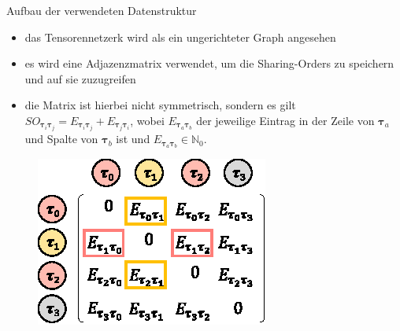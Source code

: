 \documentclass{beamer}
\begin{document}
			\begin{frame}{Aufbau der verwendeten Datenstruktur}
				\begin{itemize}
					\item das Tensorennetzerk wird als ein ungerichteter Graph angesehen
					\item es wird eine Adjazenzmatrix verwendet, um die Sharing-Orders zu speichern und auf sie zuzugreifen
					\item die Matrix ist hierbei nicht symmetrisch, 
					sondern es gilt $SO_{\bm{\tau}_i \bm{\tau}_j} = E_{\bm{\tau}_i \bm{\tau}_j} + E_{\bm{\tau}_j \bm{\tau}_i}$, wobei $E_{\bm{\tau}_a \bm{\tau}_b}$ der jeweilige Eintrag in der Zeile von $\bm{\tau}_a$ und Spalte von $\bm{\tau}_b$ ist und $E_{\bm{\tau}_a \bm{\tau}_b} \in \mathbb{N}_0$.
				\end{itemize}
				\begin{figure}
					\includegraphics{figure_05_a}
				\end{figure}
			\end{frame}
\end{document}
